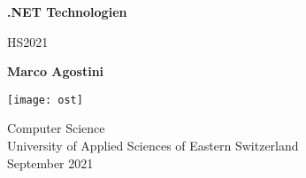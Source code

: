 \begin{titlepage}
    \begin{center}
        \vspace*{1cm}
            
        \Huge
        \textbf{.NET Technologien}
            
        \vspace{0.5cm}
        \LARGE
        HS2021
            
        \vspace{1.5cm}
            
        \textbf{Marco Agostini}
            
        \vfill
            
            
        \vspace{0.8cm}
            
        \texttt{[image: ost]}
            
        \Large
        Computer Science\\
        University of Applied Sciences of Eastern Switzerland\\
        September 2021
        

    \end{center}
\end{titlepage}

\tableofcontents

